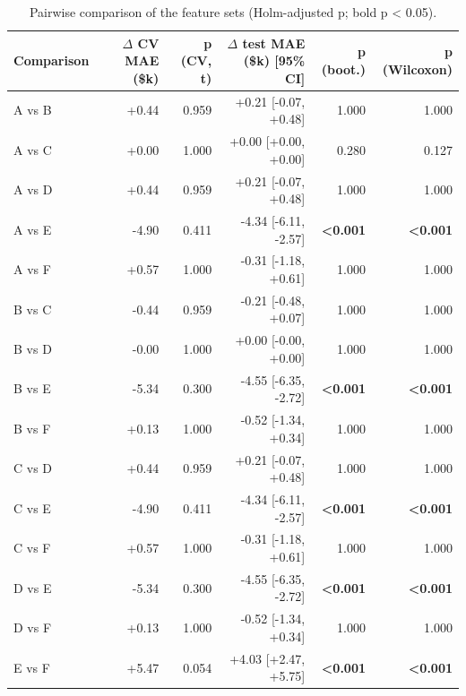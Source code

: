 \begin{table}[t]
\centering
\small
\begin{tabular}{lrrrrr}
\toprule
Comparison & $\Delta$ CV MAE (\$k) & p (CV, t) & $\Delta$ test MAE (\$k) [95\% CI] & p (boot.) & p (Wilcoxon) \\
\midrule
A vs B & +0.44 & 0.959 & +0.21 [-0.07, +0.48] & 1.000 & 1.000 \\
A vs C & +0.00 & 1.000 & +0.00 [+0.00, +0.00] & 0.280 & 0.127 \\
A vs D & +0.44 & 0.959 & +0.21 [-0.07, +0.48] & 1.000 & 1.000 \\
A vs E & -4.90 & 0.411 & -4.34 [-6.11, -2.57] & \textbf{<0.001} & \textbf{<0.001} \\
A vs F & +0.57 & 1.000 & -0.31 [-1.18, +0.61] & 1.000 & 1.000 \\
B vs C & -0.44 & 0.959 & -0.21 [-0.48, +0.07] & 1.000 & 1.000 \\
B vs D & -0.00 & 1.000 & +0.00 [-0.00, +0.00] & 1.000 & 1.000 \\
B vs E & -5.34 & 0.300 & -4.55 [-6.35, -2.72] & \textbf{<0.001} & \textbf{<0.001} \\
B vs F & +0.13 & 1.000 & -0.52 [-1.34, +0.34] & 1.000 & 1.000 \\
C vs D & +0.44 & 0.959 & +0.21 [-0.07, +0.48] & 1.000 & 1.000 \\
C vs E & -4.90 & 0.411 & -4.34 [-6.11, -2.57] & \textbf{<0.001} & \textbf{<0.001} \\
C vs F & +0.57 & 1.000 & -0.31 [-1.18, +0.61] & 1.000 & 1.000 \\
D vs E & -5.34 & 0.300 & -4.55 [-6.35, -2.72] & \textbf{<0.001} & \textbf{<0.001} \\
D vs F & +0.13 & 1.000 & -0.52 [-1.34, +0.34] & 1.000 & 1.000 \\
E vs F & +5.47 & 0.054 & +4.03 [+2.47, +5.75] & \textbf{<0.001} & \textbf{<0.001} \\
\bottomrule
\end{tabular}
\caption{Pairwise comparison of the feature sets (Holm-adjusted p; bold p < 0.05).}
\label{tab:ablation_pairwise}
\end{table}
